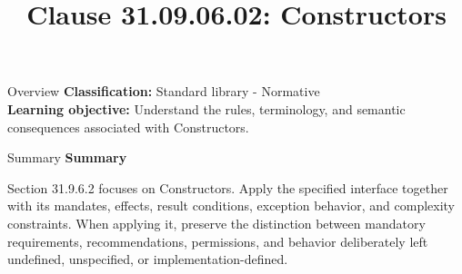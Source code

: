 \documentclass[10pt,letterpaper]{article}
\title{Clause 31.09.06.02: Constructors}
\author{}
\date{}
\begin{document}
\maketitle
\begin{CornellOverviewBox}{Overview}
\textbf{Classification:} Standard library - Normative\\[2pt]
\textbf{Learning objective:} Understand the rules, terminology, and semantic consequences associated with Constructors.
\end{CornellOverviewBox}\begin{CornellSummaryBox}{Summary}
{\sffamily\bfseries\color{Accent} Summary}\par\vspace{3pt}Section 31.9.6.2 focuses on Constructors. Apply the specified interface together with its mandates, effects, result conditions, exception behavior, and complexity constraints. When applying it, preserve the distinction between mandatory requirements, recommendations, permissions, and behavior deliberately left undefined, unspecified, or implementation-defined.
\end{CornellSummaryBox}
\end{document}
